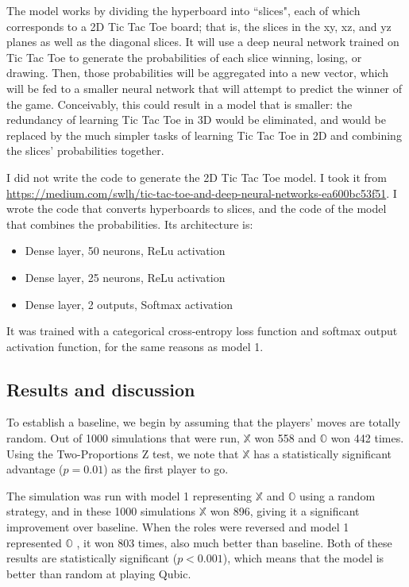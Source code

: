 \documentclass[11pt]{article}
\newcommand{\XX}{$\mathbb{X}$ }
\newcommand{\OO}{$\mathbb{O}$ }
\begin{document}
The model works by dividing the hyperboard into ``slices", each of which  corresponds to a 2D Tic Tac Toe board; that is, the slices in the xy, xz, and yz planes as well as the diagonal slices. It will use a deep neural network trained on Tic Tac Toe to generate the probabilities of each slice winning, losing, or drawing. Then, those probabilities will be aggregated into a new vector, which will be fed to a smaller neural network that will attempt to predict the winner of the game. Conceivably, this could result in a model that is smaller: the redundancy of learning Tic Tac Toe in 3D would be eliminated, and would be replaced by the much simpler tasks of learning Tic Tac Toe in 2D and combining the slices' probabilities together.

I did not write the code to generate the 2D Tic Tac Toe model. I took it from \url{https://medium.com/swlh/tic-tac-toe-and-deep-neural-networks-ea600bc53f51}. I wrote the code that converts hyperboards to slices, and the code of the model that combines the probabilities. Its architecture is:
\begin{itemize}
    \item Dense layer, 50 neurons, ReLu activation
    \item Dense layer, 25 neurons, ReLu activation
    \item Dense layer, 2 outputs, Softmax activation
\end{itemize}

It was trained with a categorical cross-entropy loss function and softmax output activation function, for the same reasons as model 1.

\subsection{Results and discussion}
To establish a baseline, we begin by assuming that the players' moves are totally random. Out of 1000 simulations that were run, \XX won 558 and \OO won 442 times. Using the Two-Proportions Z test, we note that \XX has a statistically significant advantage ($p = 0.01$) as the first player to go.

The simulation was run with model 1 representing \XX and \OO using a random strategy, and in these 1000 simulations \XX won 896, giving it a significant improvement over baseline. When the roles were reversed and model 1 represented \OO, it won 803 times, also much better than baseline. Both of these results are statistically significant ($p < 0.001$), which means that the model is better than random at playing Qubic.
\end{document}

